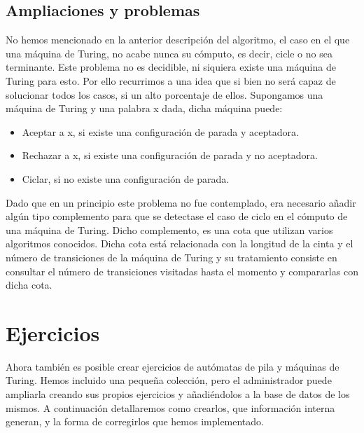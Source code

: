 \documentclass[12pt,a4paper,spanish]{book}
\begin{document}
\subsection{Ampliaciones y problemas}
No hemos mencionado en la anterior descripci\'on del algoritmo, el caso en el que una m\'aquina de Turing, no acabe nunca su c\'omputo, es decir, cicle o no sea terminante.
Este problema no es decidible, ni siquiera existe una m\'aquina de Turing para esto.
Por ello recurrimos a una idea que si bien no ser\'a capaz de solucionar todos los casos, si un alto porcentaje de ellos.
Supongamos una m\'aquina de Turing y una palabra x dada, dicha m\'aquina puede:
\begin{itemize}
\item Aceptar a x, si existe una configuraci\'on de parada y aceptadora.
\item Rechazar a x, si existe una configuraci\'on de parada y no aceptadora.
\item Ciclar, si no existe una configuraci\'on de parada.
\end{itemize}
Dado que en un principio este problema no fue contemplado, era necesario a\~nadir alg\'un tipo complemento para que se detectase el caso de ciclo en el c\'omputo de una m\'aquina de Turing. Dicho complemento, es una cota que utilizan varios algoritmos conocidos. Dicha cota est\'a relacionada con la longitud de la cinta y el n\'umero de transiciones de la m\'aquina de Turing  y su tratamiento consiste en consultar el n\'umero de transiciones visitadas hasta el momento y compararlas con dicha cota.

\newpage
\section{Ejercicios}
Ahora tambi\'en es posible crear ejercicios de aut\'omatas de pila y m\'aquinas de Turing. Hemos incluido una peque\~na colecci\'on, pero el administrador puede ampliarla creando sus propios ejercicios y a\~nadi\'endolos a la base de datos de los mismos. A continuaci\'on detallaremos como crearlos, que informaci\'on interna generan, y la forma de corregirlos que hemos implementado.\\
\end{document}
